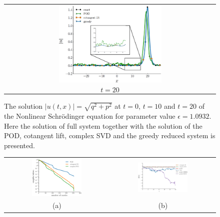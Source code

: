 \begin{figure}[t] 
\begin{center}
\begin{tabular}{c}
	\includegraphics[width=0.5\textwidth]{./figs/schrodinger/solution/solution_t20}\\
	$$t = 20$$
\end{tabular}
\end{center}
\caption{The solution $|u(t,x)| = \sqrt{q^2 + p^2}$ at $t=0$, $t=10$ and $t=20$ of the Nonlinear Schr\"odinger equation for parameter value $\epsilon = 1.0932$. Here the solution of full system together with the solution of the POD, cotangent lift, complex SVD and the greedy reduced system is presented.}\label{fig:NuRe:1}
\end{figure}

\begin{figure}[t]
\begin{center}
\begin{tabular}{cc}
	\includegraphics[width=0.5\textwidth]{./figs/schrodinger/singular} &
	\includegraphics[width=0.5\textwidth]{./figs/schrodinger/hamiltonian} \\
	(a) & (b)
\end{tabular}
\end{center}
\end{figure}

